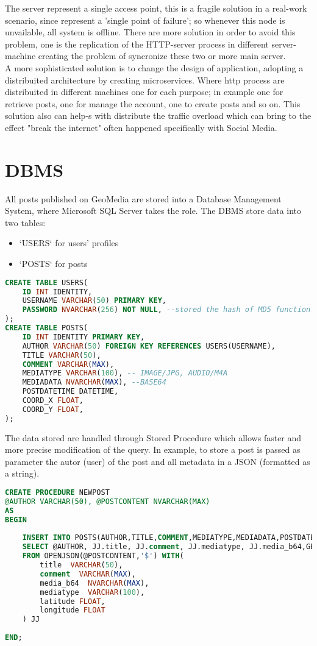 \documentclass[conference]{IEEEtran}
\begin{document}
The server represent a single access point, this is a fragile solution in a real-work scenario, since represent a 'single point of failure'; so whenever this node is unvailable, all system is offline.
There are more solution in order to avoid this problem, one is the replication of the HTTP-server process in different server-machine creating the problem of syncronize these two or more main server.
\\
A more sophisticated solution is to change the design of application, adopting a distribuited architecture by creating microservices. Where http process are distribuited in different machines one for each purpose; in example one for retrieve posts, one for manage the account, one to create posts and so on. This solution also can help-s with distribute the traffic overload which can bring to the effect "break the internet" often happened specifically with Social Media.


\section{DBMS}

All posts published on GeoMedia are stored into a Database Management System, where Microsoft SQL Server takes the role.
The DBMS store data into two tables:
\begin{itemize}
    \item `USERS` for users' profiles
    \item `POSTS` for posts 
\end{itemize}

\begin{lstlisting}[language=SQL, description=Creation of tables]
CREATE TABLE USERS(
    ID INT IDENTITY,
    USERNAME VARCHAR(50) PRIMARY KEY,
    PASSWORD NVARCHAR(256) NOT NULL, --stored the hash of MD5 function
);
CREATE TABLE POSTS(
	ID INT IDENTITY PRIMARY KEY,
	AUTHOR VARCHAR(50) FOREIGN KEY REFERENCES USERS(USERNAME),
	TITLE VARCHAR(50),
	COMMENT VARCHAR(MAX),
	MEDIATYPE VARCHAR(100), -- IMAGE/JPG, AUDIO/M4A
	MEDIADATA NVARCHAR(MAX), --BASE64
	POSTDATETIME DATETIME,
	COORD_X FLOAT,
	COORD_Y FLOAT,
);
\end{lstlisting}

The data stored are handled through Stored Procedure which allows faster and more precise modification of the query. In example, to store a post is passed as parameter the autor (user) of the post and all metadata in a JSON (formatted as a string).

\begin{lstlisting}[language=SQL, description=Stored Procedure of post creation]
CREATE PROCEDURE NEWPOST
@AUTHOR VARCHAR(50), @POSTCONTENT NVARCHAR(MAX)
AS
BEGIN
	
	INSERT INTO POSTS(AUTHOR,TITLE,COMMENT,MEDIATYPE,MEDIADATA,POSTDATETIME, LATITUDE, LONGITUDE)
	SELECT @AUTHOR, JJ.title, JJ.comment, JJ.mediatype, JJ.media_b64,GETDATE(), JJ.latitude ,JJ.longitude 
	FROM OPENJSON(@POSTCONTENT,'$') WITH(
		title  VARCHAR(50),
		comment  VARCHAR(MAX),
		media_b64  NVARCHAR(MAX),
		mediatype  VARCHAR(100),
		latitude FLOAT,
		longitude FLOAT
	) JJ
	
END;

\end{lstlisting}
\end{document}
